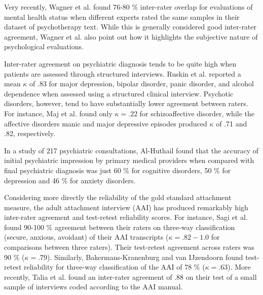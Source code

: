 \documentclass[12pt]{report}
\begin{document}
Very recently, Wagner et al. \citeyear{Wagner2023} found 76-80 \% inter-rater overlap for evaluations of mental health status when different experts rated the same samples in their dataset of psychotherapy text.
While this is generally considered good inter-rater agreement, Wagner et al. also point out how it highlights the subjective nature of psychological evaluations.

Inter-rater agreement on psychiatric diagnosis tends to be quite high when patients are assessed through structured interviews.
Ruskin et al. \citeyear{Ruskin1998} reported a mean $\kappa$ of .83 for major depression, bipolar disorder, panic disorder, and alcohol dependence when assessed using a structured clinical interview.
Psychotic disorders, however, tend to have substantially lower agreement between raters.
For instance, Maj et al. \citeyear{Maj2000} found only $\kappa = .22$ for schizoaffective disorder, while the affective disorders manic and major depressive episodes produced $\kappa$ of .71 and .82, respectively.

In a study of 217 psychiatric consultations, Al-Huthail \citeyear{Al-Huthail2008} found that the accuracy of initial psychiatric impression by primary medical providers when compared with final psychiatric diagnosis was just 60 \% for cognitive disorders, 50 \% for depression and 46 \% for anxiety disorders.

Considering more directly the reliability of the gold standard attachment measure, the adult attachment interview (AAI) has produced remarkably high inter-rater agreement and test-retest reliability scores.
For instance, Sagi et al. \citeyear{Sagi1994} found 90-100 \% agreement between their raters on three-way classification (secure, anxious, avoidant) of their AAI transcripts ($\kappa = .82 - 1.0$ for comparisons between three raters). Their test-retest agreement across raters was 90 \% ($\kappa = .79$).
Similarly, Bakermans-Kranenburg and van IJzendoorn \citeyear{BakermansKranenburg1993} found test-retest reliability for three-way classification of the AAI of 78 \% ($\kappa = .63$).
More recently, Talia et al. \citeyear{Talia2020} found an inter-rater agreement of .88 on their test of a small sample of interviews coded according to the AAI manual.
\end{document}

